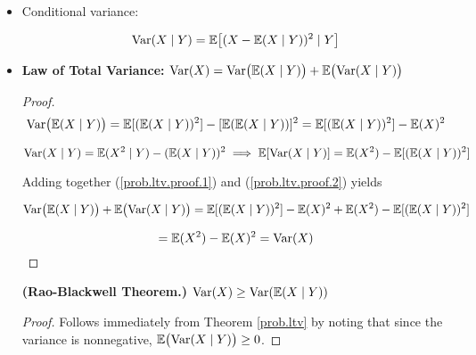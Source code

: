 \begin{itemize}
\begin{itemize}
\begin{theorem}
\begin{enumerate}[(a)]
\end{enumerate}
\end{theorem}

\item \begin{definition} Conditional variance: 

\[
\mathrm{Var}(X \mid Y) = \mathbb{E} \big[ (X - \mathbb{E}(X \mid Y))^2 \mid Y \big]
\] 

\end{definition}

\item \begin{theorem}\label{prob.ltv} \textbf{Law of Total Variance:} \( \mathrm{Var}(X) = \mathrm{Var} \big( \mathbb{E}(X \mid Y) \big) + \mathbb{E} \big( \mathrm{Var}(X \mid Y) \big) \)\end{theorem}

\begin{proof}

\begin{equation}\label{prob.ltv.proof.1}
\mathrm{Var} \big( \mathbb{E}(X \mid Y) \big) =\mathbb{E}[( \mathbb{E}(X \mid Y))^2]  - [\mathbb{E}( \mathbb{E}(X \mid Y))]^2 =  \mathbb{E}[( \mathbb{E}(X \mid Y))^2] - \mathbb{E}(X)^2
\end{equation}

\begin{equation}\label{prob.ltv.proof.2}
\mathrm{Var}(X \mid Y) = \mathbb{E}(X^2 \mid Y) - ( \mathbb{E}(X \mid Y))^2 \implies \mathbb{E}[\mathrm{Var}(X \mid Y)] = \mathbb{E}(X^2) - \mathbb{E}[( \mathbb{E}(X \mid Y))^2]
\end{equation}

Adding together (\ref{prob.ltv.proof.1}) and (\ref{prob.ltv.proof.2}) yields

\[
\mathrm{Var} \big( \mathbb{E}(X \mid Y) \big) + \mathbb{E} \big( \mathrm{Var}(X \mid Y) \big) = \mathbb{E}[( \mathbb{E}(X \mid Y))^2]  - \mathbb{E}(X)^2 +  \mathbb{E}(X^2) - \mathbb{E}[( \mathbb{E}(X \mid Y))^2] 
\]

\[
= \mathbb{E}(X^2) - \mathbb{E}(X)^2 = \mathrm{Var}(X)
\]

\end{proof}

\begin{corollary} \textbf{(Rao-Blackwell Theorem.)} \(\mathrm{Var}(X) \geq \mathrm{Var}(\mathbb{E}(X \mid Y))\)

\end{corollary}

\begin{proof} Follows immediately from Theorem \ref{prob.ltv} by noting that since the variance is nonnegative, \(\mathbb{E} \big( \mathrm{Var}(X \mid Y) \big)  \geq 0\).

\end{proof}


\end{itemize}
\end{itemize}
